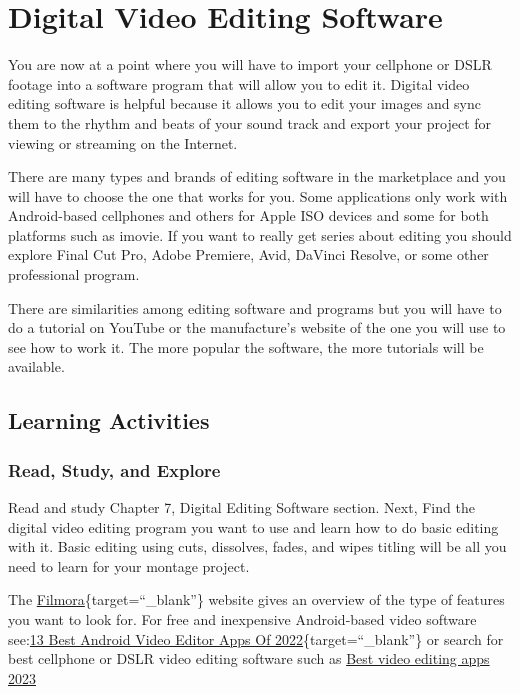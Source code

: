 \documentclass[
]{book}
\begin{document}
\hypertarget{digital-video-editing-software}{%
\section{Digital Video Editing Software}\label{digital-video-editing-software}}

You are now at a point where you will have to import your cellphone or DSLR footage into a software program that will allow you to edit it. Digital video editing software is helpful because it allows you to edit your images and sync them to the rhythm and beats of your sound track and export your project for viewing or streaming on the Internet.

There are many types and brands of editing software in the marketplace and you will have to choose the one that works for you. Some applications only work with Android-based cellphones and others for Apple ISO devices and some for both platforms such as imovie. If you want to really get series about editing you should explore Final Cut Pro, Adobe Premiere, Avid, DaVinci Resolve, or some other professional program.

There are similarities among editing software and programs but you will have to do a tutorial on YouTube or the manufacture's website of the one you will use to see how to work it. The more popular the software, the more tutorials will be available.

\hypertarget{learning-activities-2}{%
\subsection*{Learning Activities}\label{learning-activities-2}}

\begin{reflect}
\hypertarget{read-study-and-explore}{%
\subsubsection*{Read, Study, and Explore}\label{read-study-and-explore}}

Read and study Chapter 7, Digital Editing Software section. Next, Find the digital video editing program you want to use and learn how to do basic editing with it. Basic editing using cuts, dissolves, fades, and wipes titling will be all you need to learn for your montage project.

The \href{https://filmora.wondershare.net/filmora-video-editor.html?gclid=Cj0KCQjwvdXpBRCoARIsAMJSKqIlTxG4fGMlWHTHsBPoUVzFuLky1e9MATKGx5Ju5Cu356k9li7lJLwaAj2JEALw_wcB}{Filmora}\{target=``\_blank''\} website gives an overview of the type of features you want to look for. For free and inexpensive Android-based video software see:\href{https://fossbytes.com/best-android-video-editor-apps/}{13 Best Android Video Editor Apps Of 2022}\{target=``\_blank''\} or search for best cellphone or DSLR video editing software such as \href{https://www.tomsguide.com/best-picks/best-video-editing-apps}{Best video editing apps 2023}
\end{reflect}
\end{document}

